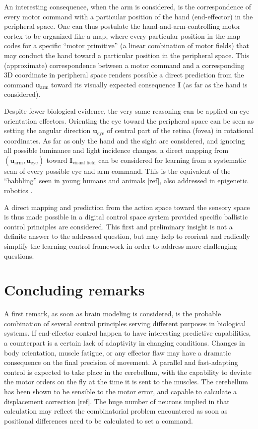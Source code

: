 \documentclass[11pt]{article}
\begin{document}
 
An interesting consequence, when the arm is considered, is the correspondence of every motor command with a particular position of the hand (end-effector) in the peripheral space. 
One can thus postulate the hand-and-arm-controlling motor cortex to be organized like a map, where every particular position in the map codes for a specific ``motor primitive'' (a linear combination of motor fields) that may conduct the hand toward a particular position in the peripheral space.
This (approximate) correspondence between a  motor command and a corresponding 3D coordinate in peripheral space renders  possible a direct prediction from the command $\boldsymbol{u}_\text{arm}$ toward its visually expected consequence $\boldsymbol{I}$ (as far as the hand is considered).

Despite fewer biological evidence, the very same reasoning can be applied on eye orientation effectors.  Orienting the eye toward the peripheral space can be seen as setting the angular direction $\boldsymbol{u}_\text{eye}$ of central part of the retina (fovea) in rotational coordinates.
As far as only the hand and the sight are considered, and ignoring all possible luminance and light incidence changes, a direct mapping from $(\boldsymbol{u}_\text{arm}, 
	\boldsymbol{u}_\text{eye})$ toward $\boldsymbol{I}_\text{visual field}$ can be considered for learning from a systematic scan of every possible eye and arm command. This is the equivalent of the ``babbling'' seen in young humans and animals [ref], also addressed in epigenetic robotics . 

A direct mapping and prediction from the action space toward the sensory space is thus made possible in a digital control space system provided specific ballistic control principles are considered. This first and preliminary insight is not a definite answer to the addressed question, but may help to reorient and radically simplify the learning control framework in order to address more challenging questions. 

\section{Concluding remarks}

A first remark, as soon as  brain modeling is considered, is the probable combination of several control principles serving different purposes in biological systems. 
If end-effector control happen to have interesting predictive capabilities, a counterpart is a certain lack of adaptivity in changing conditions.  Changes in body orientation, muscle fatigue, or any effector flaw may have a dramatic consequence on the final precision of movement. A parallel and fast-adapting control is expected to take place in the cerebellum, with the capability to deviate the motor orders on the fly at the time it is sent to the muscles.  The cerebellum has been shown to be sensible to the motor error, and capable to calculate a displacement correction [ref]. The huge number of neurons implied in that calculation may reflect the combinatorial problem encountered as soon as positional differences need to be calculated to set a command. 
 
\end{document}

